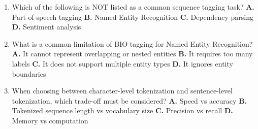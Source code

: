 \documentclass[11pt]{article}
\begin{document}
\begin{enumerate}[leftmargin=*]
  \item Which of the following is NOT listed as a common sequence tagging task?
    \textbf{A.} Part-of-speech tagging
    \textbf{B.} Named Entity Recognition
    \textbf{C.} Dependency parsing
    \textbf{D.} Sentiment analysis

  \item What is a common limitation of BIO tagging for Named Entity Recognition?
    \textbf{A.} It cannot represent overlapping or nested entities
    \textbf{B.} It requires too many labels
    \textbf{C.} It does not support multiple entity types
    \textbf{D.} It ignores entity boundaries

  \item When choosing between character-level tokenization and sentence-level tokenization, which trade-off must be considered?
    \textbf{A.} Speed vs accuracy
    \textbf{B.} Tokenized sequence length vs vocabulary size
    \textbf{C.} Precision vs recall
    \textbf{D.} Memory vs computation

\end{enumerate}
\end{document}
